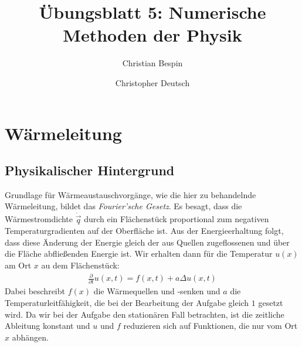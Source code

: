 \documentclass[10pt,a4paper]{article}
\author{Christian Bespin \and Christopher Deutsch}
\title{Übungsblatt 5: Numerische Methoden der Physik}
\begin{document}
\maketitle

\setcounter{section}{4}

\section{Wärmeleitung}

\subsection{Physikalischer Hintergrund}
Grundlage für Wärmeaustauschvorgänge, wie die hier zu behandelnde Wärmeleitung, bildet das \emph{Fourier'sche Gesetz}. Es besagt, dass die Wärmestromdichte $\dot{\vec{q}}$ durch ein Flächenstück proportional zum negativen Temperaturgradienten auf der Oberfläche ist. Aus der Energieerhaltung folgt, dass diese Änderung der Energie gleich der aus Quellen zugeflossenen und über die Fläche abfließenden Energie ist. Wir erhalten dann für die Temperatur $u(x)$ am Ort $x$ au dem Flächenstück:
\begin{align}  
\frac{\partial}{\partial t}u(x,t)=f(x,t)+ a \Delta u(x,t)
\end{align}
Dabei beschreibt $f(x)$ die Wärmequellen und -senken und $a$ die Temperaturleitfähigkeit, die bei der Bearbeitung der Aufgabe gleich $1$ gesetzt wird. Da wir bei der Aufgabe den stationären Fall betrachten, ist die zeitliche Ableitung konstant und $u$ und $f$ reduzieren sich auf Funktionen, die nur vom Ort $x$ abhängen.
\end{document}
